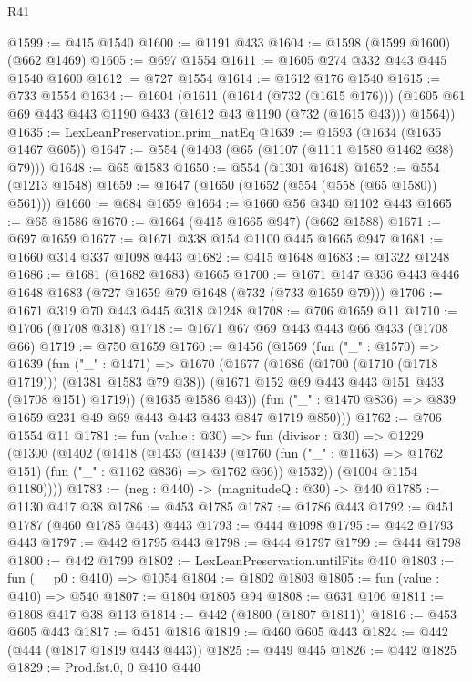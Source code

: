 \begin{lexlean}{R41}
\begin{coremodule}
@1599 := @415 @1540
@1600 := @1191 @433
@1604 := @1598 (@1599 @1600) (@662 @1469)
@1605 := @697 @1554
@1611 := @1605 @274 @332 @443 @445 @1540 @1600
@1612 := @727 @1554
@1614 := @1612 @176 @1540
@1615 := @733 @1554
@1634 := @1604
    (@1611
      (@1614 (@732 (@1615 @176)))
      (@1605 @61 @69 @443 @443 @1190 @433 (@1612 @43 @1190 (@732 (@1615 @43))) @1564))
@1635 := LexLeanPreservation.prim_natEq
@1639 := @1593 (@1634 (@1635 @1467 @605))
@1647 := @554 (@1403 (@65 (@1107 (@1111 @1580 @1462 @38) @79)))
@1648 := @65 @1583
@1650 := @554 (@1301 @1648)
@1652 := @554 (@1213 @1548)
@1659 := @1647 (@1650 (@1652 (@554 (@558 (@65 @1580)) @561)))
@1660 := @684 @1659
@1664 := @1660 @56 @340 @1102 @443
@1665 := @65 @1586
@1670 := @1664 (@415 @1665 @947) (@662 @1588)
@1671 := @697 @1659
@1677 := @1671 @338 @154 @1100 @445 @1665 @947
@1681 := @1660 @314 @337 @1098 @443
@1682 := @415 @1648
@1683 := @1322 @1248
@1686 := @1681 (@1682 @1683) @1665
@1700 := @1671 @147 @336 @443 @446 @1648 @1683 (@727 @1659 @79 @1648 (@732 (@733 @1659 @79)))
@1706 := @1671 @319 @70 @443 @445 @318 @1248
@1708 := @706 @1659 @11
@1710 := @1706 (@1708 @318)
@1718 := @1671 @67 @69 @443 @443 @66 @433 (@1708 @66)
@1719 := @750 @1659
@1760 := @1456
    (@1569
      (fun ("_" : @1570) =>
      @1639
        (fun ("_" : @1471) =>
        @1670
          (@1677
            (@1686 (@1700 (@1710 (@1718 @1719))) (@1381 @1583 @79 @38))
            (@1671 @152 @69 @443 @443 @151 @433 (@1708 @151) @1719))
          (@1635 @1586 @43))
        (fun ("_" : @1470 @836) => @839 @1659 @231 @49 @69 @443 @443 @433 @847 @1719 @850)))
@1762 := @706 @1554 @11
@1781 := fun (value : @30) =>
  fun (divisor : @30) =>
  @1229
    (@1300
      (@1402
        (@1418
          (@1433
            (@1439
              (@1760 (fun ("_" : @1163) => @1762 @151) (fun ("_" : @1162 @836) => @1762 @66))
              @1532))
          (@1004 @1154 @1180))))
@1783 := (neg : @440) -> (magnitudeQ : @30) -> @440
@1785 := @1130 @417 @38
@1786 := @453 @1785
@1787 := @1786 @443
@1792 := @451 @1787 (@460 @1785 @443) @443
@1793 := @444 @1098
@1795 := @442 @1793 @443
@1797 := @442 @1795 @443
@1798 := @444 @1797
@1799 := @444 @1798
@1800 := @442 @1799
@1802 := LexLeanPreservation.untilFits @410
@1803 := fun (__p0 : @410) => @1054
@1804 := @1802 @1803
@1805 := fun (value : @410) => @540
@1807 := @1804 @1805 @94
@1808 := @631 @106
@1811 := @1808 @417 @38 @113
@1814 := @442 (@1800 (@1807 @1811))
@1816 := @453 @605 @443
@1817 := @451 @1816
@1819 := @460 @605 @443
@1824 := @442 (@444 (@1817 @1819 @443 @443))
@1825 := @449 @445
@1826 := @442 @1825
@1829 := Prod.fst.{0, 0} @410 @440

\end{coremodule}
\end{lexlean}
